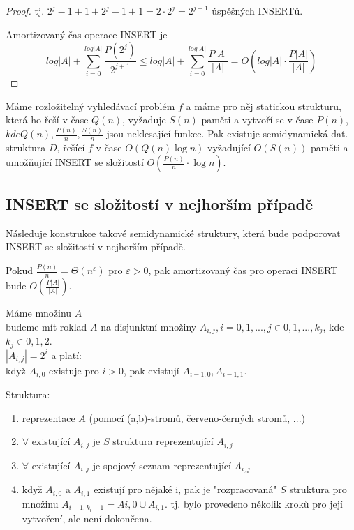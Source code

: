 \begin{proof}
tj. $2^j -1 + 1 + 2^j -1 + 1 = 2 \cdot 2^j = 2^{j+1}$ úspěšných INSERTů.

Amortizovaný čas operace INSERT je 
$$
log |A| + \sum_{i=0}^{log |A|} \frac{P(2^j)}{2^{j+1}} \leq
log |A| + \sum_{i=0}^{log |A|} \frac{P|A|}{|A|} = 
O(log |A| \cdot \frac{P|A|}{|A|})
$$

\end{proof}

\begin{theorem}
Máme rozložitelný vyhledávací problém $f$ a máme pro něj statickou strukturu,
která ho řeší v čase $Q(n)$, vyžaduje $S(n)$ paměti a vytvoří se v čase
$P(n)$,
$kde Q(n), \frac{P(n)}{n}, \frac{S(n)}{n}$ jsou neklesající funkce. Pak
existuje semidynamická dat. struktura $D$, řešící $f$ v čase
$O(Q(n)\log n)$ vyžadující $O(S(n))$ paměti a umožňující INSERT se
složitostí
$O(\frac{P(n)}{n} \cdot\log n)$.
\end{theorem}


\subsection{INSERT se složitostí v nejhorším případě}

Následuje konstrukce takové semidynamické struktury, která bude podporovat
INSERT se složitostí v nejhorším případě.

\begin{pozn}
Pokud $\frac{P(n)}{n} = \Theta(n^\varepsilon)$ pro $\varepsilon > 0$, pak
amortizovaný čas pro operaci INSERT bude $O(\frac{P|A|}{|A|})$.
\end{pozn}

Máme množinu $A$ \\
budeme mít roklad $A$ na disjunktní množiny $A_{i,j}, i=0,1,..., j \in
{0,1,...,k_j}$, kde $k_j \in {0,1,2}$. \\
$|A_{i,j}| = 2^i$ a platí: \\
když $A_{i,0}$ existuje pro $i > 0$, pak existují $A_{i-1,0}, A_{i-1,1}$.
\par

Struktura: 
\begin{enumerate}
\item reprezentace $A$ (pomocí (a,b)-stromů, červeno-černých stromů, ...)
\item $\forall$ existující $A_{i,j}$ je $S$ struktura reprezentující
$A_{i,j}$ 
\item $\forall$ existující $A_{i,j}$ je spojový seznam reprezentující
$A_{i,j}$
\item když $A_{i,0}$ a $A_{i,1}$ existují pro nějaké i, pak je 
"rozpracovaná" $S$ struktura pro množinu $A_{i-1,k_i+1} = A{i,0} \cup
A_{i,1}$.
tj. bylo provedeno několik kroků pro její vytvoření, ale není dokončena.
\end{enumerate}


